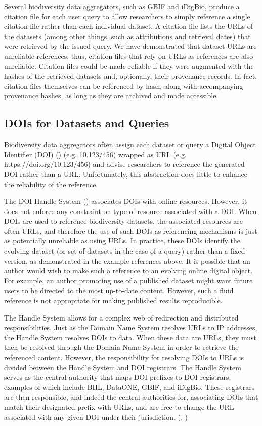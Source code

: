 \documentclass[10pt,letterpaper]{article}
\begin{document}
Several biodiversity data aggregators, such as GBIF and iDigBio, produce a citation file for each user query to allow researchers to simply reference a single citation file rather than each individual dataset. A citation file lists the URLs of the datasets (among other things, such as attributions and retrieval dates) that were retrieved by the issued query. We have demonstrated that dataset URLs are unreliable references; thus, citation files that rely on URLs as references are also unreliable. Citation files could be made reliable if they were augmented with the hashes of the retrieved datasets and, optionally, their provenance records. In fact, citation files themselves can be referenced by hash, along with accompanying provenance hashes, as long as they are archived and made accessible.

\subsection*{DOIs for Datasets and Queries}

Biodiversity data aggregators often assign each dataset or query a Digital Object Identifier (DOI) (\cite{Paskin_2009}) (e.g. 10.123/456) wrapped as URL (e.g. https://doi.org/10.123/456) and advise researchers to reference the generated DOI rather than a URL. Unfortunately, this abstraction does little to enhance the reliability of the reference. 

The DOI Handle System (\cite{Paskin_2009}) associates DOIs with online resources. However, it does not enforce any constraint on type of resource associated with a DOI. When DOIs are used to reference biodiversity datasets, the associated resources are often URLs, and therefore the use of such DOIs as referencing mechanisms is just as potentially unreliable as using URLs. In practice, these DOIs identify the evolving dataset (or set of datasets in the case of a query) rather than a fixed version, as demonstrated in the example references above. It is possible that an author would wish to make such a reference to an evolving online digital object. For example, an author promoting use of a published dataset might want future users to be directed to the most up-to-date content. However, such a fluid reference is not appropriate for making published results reproducible. 

The Handle System allows for a complex web of redirection and distributed responsibilities. Just as the Domain Name System resolves URLs to IP addresses, the Handle System resolves DOIs to data. When these data are URLs, they must then be resolved through the Domain Name System in order to retrieve the referenced content. However, the responsibility for resolving DOIs to URLs is divided between the Handle System and DOI registrars. The Handle System serves as the central authority that maps DOI prefixes to DOI registrars, examples of which include BHL, DataONE, GBIF, and iDigBio. These registrars are then responsible, and indeed the central authorities for, associating DOIs that match their designated prefix with URLs, and are free to change the URL associated with any given DOI under their jurisdiction. (\cite{Paskin_2009}, \cite{DOI_2018}) 
\end{document}
